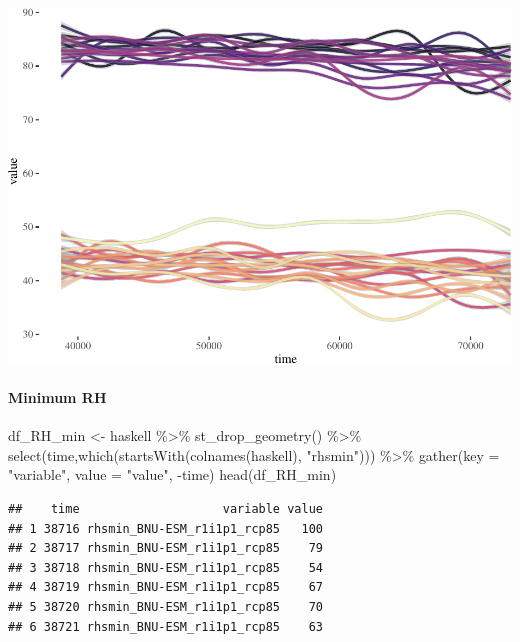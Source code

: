 \documentclass[
  paper=a4,
  ,captions=tableheading
]{scrartcl}
\newenvironment{Shaded}{\begin{snugshade}}{\end{snugshade}}
\newcommand{\AttributeTok}[1]{\textcolor[rgb]{0.77,0.63,0.00}{#1}}
\newcommand{\FunctionTok}[1]{\textcolor[rgb]{0.00,0.00,0.00}{#1}}
\newcommand{\NormalTok}[1]{#1}
\newcommand{\OtherTok}[1]{\textcolor[rgb]{0.56,0.35,0.01}{#1}}
\newcommand{\SpecialCharTok}[1]{\textcolor[rgb]{0.00,0.00,0.00}{#1}}
\newcommand{\StringTok}[1]{\textcolor[rgb]{0.31,0.60,0.02}{#1}}
\begin{document}
\includegraphics{Haskell_files/figure-latex/unnamed-chunk-75-1.pdf}

\hypertarget{minimum-rh}{%
\paragraph{Minimum RH}\label{minimum-rh}}

\begin{Shaded}
\begin{Highlighting}[]
\NormalTok{df\_RH\_min }\OtherTok{\textless{}{-}}\NormalTok{ haskell }\SpecialCharTok{\%\textgreater{}\%}
  \FunctionTok{st\_drop\_geometry}\NormalTok{() }\SpecialCharTok{\%\textgreater{}\%}
  \FunctionTok{select}\NormalTok{(time,}\FunctionTok{which}\NormalTok{(}\FunctionTok{startsWith}\NormalTok{(}\FunctionTok{colnames}\NormalTok{(haskell), }\StringTok{"rhsmin"}\NormalTok{))) }\SpecialCharTok{\%\textgreater{}\%}
  \FunctionTok{gather}\NormalTok{(}\AttributeTok{key =} \StringTok{"variable"}\NormalTok{, }\AttributeTok{value =} \StringTok{"value"}\NormalTok{, }\SpecialCharTok{{-}}\NormalTok{time)}
\FunctionTok{head}\NormalTok{(df\_RH\_min)}
\end{Highlighting}
\end{Shaded}

\begin{verbatim}
##    time                    variable value
## 1 38716 rhsmin_BNU-ESM_r1i1p1_rcp85   100
## 2 38717 rhsmin_BNU-ESM_r1i1p1_rcp85    79
## 3 38718 rhsmin_BNU-ESM_r1i1p1_rcp85    54
## 4 38719 rhsmin_BNU-ESM_r1i1p1_rcp85    67
## 5 38720 rhsmin_BNU-ESM_r1i1p1_rcp85    70
## 6 38721 rhsmin_BNU-ESM_r1i1p1_rcp85    63
\end{verbatim}
\end{document}
